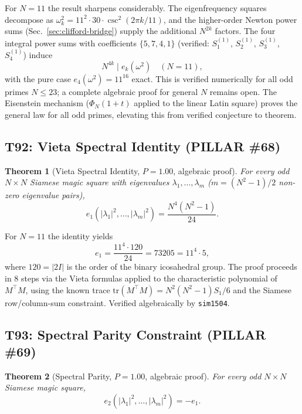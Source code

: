 \documentclass[aps,prd,twocolumn,superscriptaddress,floatfix,nofootinbib]{revtex4-2}
\newtheorem{theorem}{Theorem}
\theoremstyle{definition}
\theoremstyle{remark}
\begin{document}
For $N=11$ the result sharpens considerably.  The eigenfrequency squares
decompose as $\omega_k^2 = 11^2 \cdot 30 \cdot \csc^2(2\pi k/11)$, and
the higher-order Newton power sums (Sec.~\ref{sec:clifford-bridge})
supply the additional $N^{2k}$ factors.  The four integral power sums
with coefficients $\{5, 7, 4, 1\}$ (verified: $S_1^{(1)}$, $S_2^{(1)}$,
$S_3^{(1)}$, $S_4^{(1)}$) induce
\[
N^{4k} \mid e_k(\omega^2) \quad (N=11),
\]
with the pure case $e_4(\omega^2) = 11^{16}$ exact.  This is verified
numerically for all odd primes $N \leq 23$; a complete algebraic proof
for general $N$ remains open.  The Eisenstein mechanism ($\Phi_N(1+t)$
applied to the linear Latin square) proves the general law for all odd
primes, elevating this from verified conjecture to theorem.

\subsection{T92: Vieta Spectral Identity (PILLAR \#68)}
\label{sec:t92-vieta-spectral}

\begin{theorem}[Vieta Spectral Identity, $P{=}1.00$, algebraic proof]
\label{thm:t92}
For every odd $N{\times}N$ Siamese magic square with eigenvalues
$\lambda_1,\ldots,\lambda_m$ ($m = (N^2-1)/2$ non-zero eigenvalue pairs),
\[
e_1\!\left(|\lambda_1|^2,\ldots,|\lambda_m|^2\right)
= \frac{N^4(N^2-1)}{24}.
\]
\end{theorem}

For $N=11$ the identity yields
\[
e_1 = \frac{11^4 \cdot 120}{24} = 73205 = 11^4 \cdot 5,
\]
where $120 = |2I|$ is the order of the binary icosahedral group.
The proof proceeds in 8 steps via the Vieta formulas applied to the
characteristic polynomial of $M^{\top}M$, using the known trace
$\mathrm{tr}(M^{\top}M) = N^2(N^2-1)S_1/6$ and the Siamese
row/column-sum constraint.  Verified algebraically by \texttt{sim1504}.

\subsection{T93: Spectral Parity Constraint (PILLAR \#69)}
\label{sec:t93-spectral-parity}

\begin{theorem}[Spectral Parity, $P{=}1.00$, algebraic proof]
\label{thm:t93}
For every odd $N{\times}N$ Siamese magic square,
\[
e_2\!\left(|\lambda_1|^2,\ldots,|\lambda_m|^2\right) = -e_1.
\]
\end{theorem}
\end{document}
